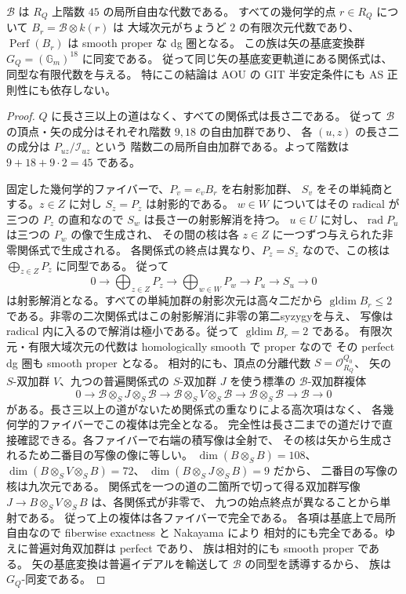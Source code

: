 \begin{theorem}[全関係式空間上の有限代数と導来圏]
\label{thm:universal-directed-family}
$\mathscr B$ は $R_Q$ 上階数 $45$ の局所自由な代数である。
すべての幾何学的点 $r\in R_Q$ について $B_r=\mathscr B\otimes k(r)$ は
大域次元がちょうど $2$ の有限次元代数であり、
$\operatorname{Perf}(B_r)$ は smooth proper な dg 圏となる。
この族は矢の基底変換群 $G_Q=(\mathbb G_m)^{18}$ に同変である。
従って同じ矢の基底変更軌道にある関係式は、同型な有限代数を与える。
特にこの結論は AOU の GIT 半安定条件にも AS 正則性にも依存しない。
\end{theorem}
\begin{proof}
$Q$ に長さ三以上の道はなく、すべての関係式は長さ二である。
従って $\mathscr B$ の頂点・矢の成分はそれぞれ階数 $9,18$ の自由加群であり、
各 $(u,z)$ の長さ二の成分は $P_{uz}/\mathscr I_{uz}$ という
階数二の局所自由加群である。よって階数は $9+18+9\cdot2=45$ である。

固定した幾何学的ファイバーで、$P_v=e_vB_r$ を右射影加群、
$S_v$ をその単純商とする。$z\in Z$ に対し $S_z=P_z$ は射影的である。
$w\in W$ についてはその radical が三つの $P_z$ の直和なので
$S_w$ は長さ一の射影解消を持つ。
$u\in U$ に対し、$\operatorname{rad}P_u$ は三つの $P_w$ の像で生成され、
その間の核は各 $z\in Z$ に一つずつ与えられた非零関係式で生成される。
各関係式の終点は異なり、$P_z=S_z$ なので、この核は
$\bigoplus_{z\in Z}P_z$ に同型である。
従って
\[
 0\longrightarrow\bigoplus_{z\in Z}P_z
 \longrightarrow\bigoplus_{w\in W}P_w
 \longrightarrow P_u\longrightarrow S_u\longrightarrow0
\]
は射影解消となる。すべての単純加群の射影次元は高々二だから
$\operatorname{gldim}B_r\le2$ である。非零の二次関係式はこの射影解消に非零の第二syzygyを与え、
写像は radical 内に入るので解消は極小である。従って
$\operatorname{gldim}B_r=2$ である。
有限次元・有限大域次元の代数は homologically smooth で proper なので
その perfect dg 圏も smooth proper となる。
相対的にも、頂点の分離代数 $S=\mathcal O_{R_Q}^{Q_0}$、
矢の $S$-双加群 $V$、九つの普遍関係式の $S$-双加群 $J$ を使う標準の
$\mathscr B$-双加群複体
\[
 0\longrightarrow \mathscr B\otimes_S J\otimes_S\mathscr B
 \longrightarrow \mathscr B\otimes_S V\otimes_S\mathscr B
 \longrightarrow \mathscr B\otimes_S\mathscr B
 \longrightarrow \mathscr B\longrightarrow0
\]
がある。長さ三以上の道がないため関係式の重なりによる高次項はなく、
各幾何学的ファイバーでこの複体は完全となる。
完全性は長さ二までの道だけで直接確認できる。各ファイバーで右端の積写像は全射で、
その核は矢から生成されるため二番目の写像の像に等しい。
$\dim(B\otimes_S B)=108$、$\dim(B\otimes_S V\otimes_S B)=72$、
$\dim(B\otimes_S J\otimes_S B)=9$ だから、
二番目の写像の核は九次元である。
関係式を一つの道の二箇所で切って得る双加群写像
$J\to B\otimes_S V\otimes_S B$ は、各関係式が非零で、
九つの始点終点が異なることから単射である。
従って上の複体は各ファイバーで完全である。
各項は基底上で局所自由なので fiberwise exactness と Nakayama により
相対的にも完全である。ゆえに普遍対角双加群は perfect であり、
族は相対的にも smooth proper である。
矢の基底変換は普遍イデアルを輸送して $\mathscr B$ の同型を誘導するから、
族は $G_Q$-同変である。
\end{proof}

